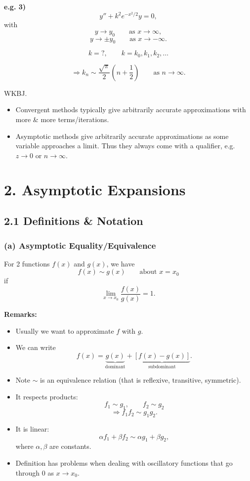 \documentclass[11pt,a4paper]{article}
\begin{document}
\noindent\textbf{e.g. 3)}
\[
y''+k^2e^{-x^2/2}y=0,
\]
with
\[
y\to y_0 \qquad \text{as }x\to\infty,
\]
\[
y\to \pm y_0 \qquad \text{as }x\to-\infty.
\]

\[
k=?,
\qquad k=k_0,k_1,k_2,\ldots
\]

\[
\Longrightarrow
k_n\sim\frac{\sqrt{\pi}}{2}
\left(n+\frac12\right)
\qquad \text{as }n\to\infty.
\]

\noindent WKBJ.

\medskip

\begin{itemize}
    \item Convergent methods typically give arbitrarily accurate approximations with more \& more terms/iterations.

    \item Asymptotic methods give arbitrarily accurate approximations as some variable approaches a limit. Thus they always come with a qualifier, e.g.\ $z\to0$ or $n\to\infty$.
\end{itemize}


\section*{2. Asymptotic Expansions}

\subsection*{2.1 Definitions \& Notation}

\subsubsection*{(a) Asymptotic Equality/Equivalence}

For 2 functions $f(x)$ and $g(x)$, we have
\[
f(x)\sim g(x)
\qquad \text{about }x=x_0
\]
if
\[
\boxed{
\lim_{x\to x_0}\frac{f(x)}{g(x)}=1.
}
\]

\noindent\textbf{Remarks:}

\begin{itemize}
    \item Usually we want to approximate $f$ with $g$.

    \item We can write
    \[
    f(x)=
    \underbrace{g(x)}_{\text{dominant}}
    +
    \underbrace{[f(x)-g(x)]}_{\text{subdominant}}.
    \]

    \item Note $\sim$ is an equivalence relation
    (that is reflexive, transitive, symmetric).

    \item It respects products:
    \[
    f_1\sim g_1,\qquad f_2\sim g_2
    \]
    \[
    \Longrightarrow f_1f_2\sim g_1g_2.
    \]

    \item It is linear:
    \[
    \alpha f_1+\beta f_2
    \sim \alpha g_1+\beta g_2,
    \]
    where $\alpha,\beta$ are constants.

    \item Definition has problems when dealing with oscillatory functions that go through $0$ as $x\to x_0$.
\end{itemize}
\end{document}
